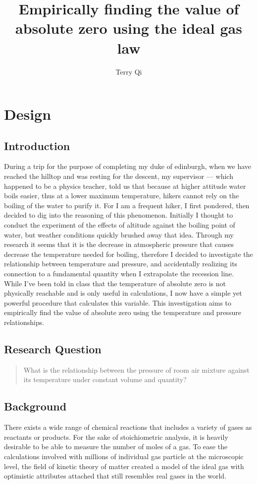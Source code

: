 \documentclass[a4paper,12pt]{article}
\title{Empirically finding the value of absolute zero using the ideal gas law}
\author{Terry Qi}
\begin{document}
\maketitle

\section{Design}
\subsection{Introduction}

During a trip for the purpose of completing my duke of edinburgh, when we have reached the hilltop and was resting for the descent, my supervisor --- which happened to be a physics teacher, told us that because at higher attitude water boils easier, thus at a lower maximum temperature, hikers cannot rely on the boiling of the water to purify it. For I am a frequent hiker, I first pondered, then decided to dig into the reasoning of this phenomenon. Initially I thought to conduct the experiment of the effects of altitude against the boiling point of water, but weather conditions quickly brushed away that idea. Through my research it seems that it is the decrease in atmospheric pressure that causes decrease the temperature needed for boiling, therefore I decided to investigate the relationship between temperature and pressure, and accidentally realizing its connection to a fundamental quantity when I extrapolate the recession line. While I've been told in class that the temperature of absolute zero is not physically reachable and is only useful in calculations, I now have a simple yet powerful procedure that calculates this variable. This investigation aims to empirically find the value of absolute zero using the temperature and pressure relationships.


\subsection{Research Question}
\begin{quote}
    What is the relationship between the pressure of room air mixture against its temperature under constant volume and quantity?
\end{quote}

\subsection{Background}
There exists a wide range of chemical reactions that includes a variety of gases as reactants or products. For the sake of stoichiometric analysis, it is heavily desirable to be able to measure the number of moles of a gas. To ease the calculations involved with millions of individual gas particle at the microscopic level, the field of kinetic theory of matter created a model of the ideal gas with optimistic attributes attached that still resembles real gases in the world.
\end{document}
